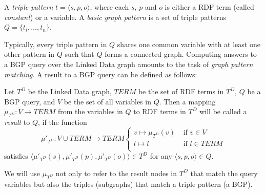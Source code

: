 \begin{definition}
  A \emph{triple pattern} $t=\langle s,p,o \rangle$, where each $s$,
  $p$ and $o$ is either a RDF term (called \emph{constant}) or a
  variable. A \emph{basic graph pattern} is a set of triple patterns
  $Q=\{t_i,\ldots,t_n\}$.
\end{definition}

Typically, every triple pattern in $Q$ shares one common variable with
at least one other pattern in $Q$ such that $Q$ forms a connected
graph. Computing answers to a BGP query over the Linked Data graph
amounts to the task of \emph{graph pattern matching}. A result to a
BGP query can be defined as follows:

\begin{definition}[Result]
  Let $T^D$ be the Linked Data graph, $TERM$ be the set of RDF terms
  in $T^D$, $Q$ be a BGP query, and $V$ be the set of all variables in
  $Q$. Then a mapping $\mu_{T^D}: V \to TERM$ from the variables in
  $Q$ to RDF terms in $T^D$ will be called a \emph{result} to $Q$, if
  the function
  \[
  \mu'_{T^D}: V \cup TERM \to TERM \left\{
    \begin{array}{ll}
      v \mapsto \mu_{T^D}(v) & \mbox{ if } v\in V \\
      l \mapsto l & \mbox{ if } l \in TERM\\
    \end{array}\right.
  \]
satisfies $\langle \mu'_{T^D}(s),\mu'_{T^D}(p), \mu'_{T^D}(o) \rangle
\in T^D$ for any $\langle s,p,o \rangle \in Q$.
\end{definition}

We will use $\mu_{T^D}$ not only to refer to
the result nodes in ${T^D}$ that match the query variables but also the
triples (subgraphs) that match a triple pattern (a BGP).

